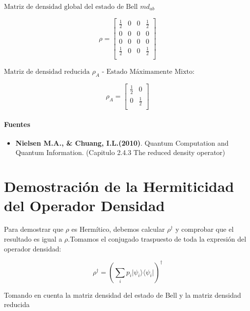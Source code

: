 \documentclass[11pt]{article}
\providecommand{\tightlist}{%
      \setlength{\itemsep}{0pt}\setlength{\parskip}{0pt}}
\begin{document}
    $\displaystyle \text{Matriz de densidad global del estado de Bell } md_{ab}$

    
    $$
\rho = 
\begin{bmatrix}
\frac{1}{2} & 0 & 0 & \frac{1}{2}  \\
 0 & 0 & 0 & 0  \\
 0 & 0 & 0 & 0  \\
 \frac{1}{2} & 0 & 0 & \frac{1}{2}  \\
 \end{bmatrix}
$$

    
    $\displaystyle \text{Matriz de densidad reducida } \rho_A \text{ - Estado Máximamente Mixto:}$

    
    $$
\rho_A = 
\begin{bmatrix}
\frac{1}{2} & 0  \\
 0 & \frac{1}{2}  \\
 \end{bmatrix}
$$

    
    \paragraph{Fuentes}\label{fuentes}

\begin{itemize}
\tightlist
\item
  \textbf{Nielsen M.A., \& Chuang, I.L.(2010)}. Quantum Computation and
  Quantum Information. (Capitulo 2.4.3 The reduced density operator)
\end{itemize}

    \section{Demostración de la Hermiticidad del Operador
Densidad}\label{demostraciuxf3n-de-la-hermiticidad-del-operador-densidad}

Para demostrar que \(\rho\) es Hermítico, debemos calcular
\(\rho^\dagger\) y comprobar que el resultado es igual a
\(\rho\).Tomamos el conjugado traspuesto de toda la expresión del
operador densidad:

\[\rho^\dagger = \left( \sum_i p_i \vert{}\psi_i\rangle \langle \psi_i\vert{} \right)^\dagger\]

Tomando en cuenta la matriz densidad del estado de Bell y la matriz
densidad reducida
\end{document}
